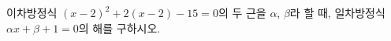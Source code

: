 이차방정식 $(x-2)^2+2(x-2)-15=0$의 두 근을 $\alpha$, $\beta$라 할 때, 일차방정식 $\alpha x+\beta+1=0$의 해를 구하시오. \cond{$\alpha<\beta$}
